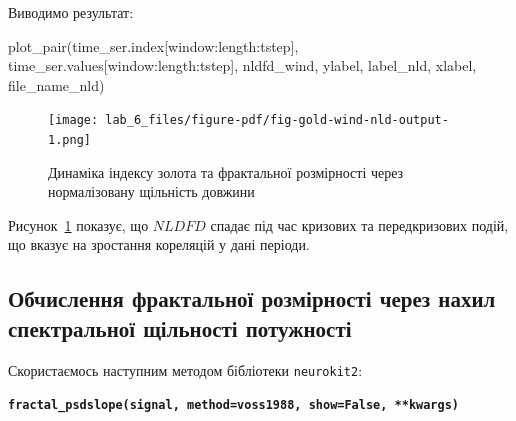 \documentclass[
  letterpaper,
]{report}
\newenvironment{Shaded}{\begin{snugshade}}{\end{snugshade}}
\newcommand{\NormalTok}[1]{\textcolor[rgb]{0.00,0.23,0.31}{#1}}
\begin{document}
Виводимо результат:

\begin{Shaded}
\begin{Highlighting}[]
\NormalTok{plot\_pair(time\_ser.index[window:length:tstep],}
\NormalTok{          time\_ser.values[window:length:tstep],}
\NormalTok{          nldfd\_wind, }
\NormalTok{          ylabel, }
\NormalTok{          label\_nld,}
\NormalTok{          xlabel,}
\NormalTok{          file\_name\_nld)}
\end{Highlighting}
\end{Shaded}

\begin{figure}[H]

{\centering \texttt{[image: lab\_6\_files/figure-pdf/fig-gold-wind-nld-output-1.png]}

}

\caption{\label{fig-gold-wind-nld}Динаміка індексу золота та фрактальної
розмірності через нормалізовану щільність довжини}

\end{figure}

Рисунок~\ref{fig-gold-wind-nld} показує, що \(NLDFD\) спадає під час
кризових та передкризових подій, що вказує на зростання кореляцій у дані
періоди.

\hypertarget{ux43eux431ux447ux438ux441ux43bux435ux43dux43dux44f-ux444ux440ux430ux43aux442ux430ux43bux44cux43dux43eux457-ux440ux43eux437ux43cux456ux440ux43dux43eux441ux442ux456-ux447ux435ux440ux435ux437-ux43dux430ux445ux438ux43b-ux441ux43fux435ux43aux442ux440ux430ux43bux44cux43dux43eux457-ux449ux456ux43bux44cux43dux43eux441ux442ux456-ux43fux43eux442ux443ux436ux43dux43eux441ux442ux456}{%
\subsection{Обчислення фрактальної розмірності через нахил спектральної
щільності
потужності}\label{ux43eux431ux447ux438ux441ux43bux435ux43dux43dux44f-ux444ux440ux430ux43aux442ux430ux43bux44cux43dux43eux457-ux440ux43eux437ux43cux456ux440ux43dux43eux441ux442ux456-ux447ux435ux440ux435ux437-ux43dux430ux445ux438ux43b-ux441ux43fux435ux43aux442ux440ux430ux43bux44cux43dux43eux457-ux449ux456ux43bux44cux43dux43eux441ux442ux456-ux43fux43eux442ux443ux436ux43dux43eux441ux442ux456}}

Скористаємось наступним методом бібліотеки \texttt{neurokit2}:

\textbf{\texttt{fractal\_psdslope(signal,\ method=\textquotesingle{}voss1988\textquotesingle{},\ show=False,\ **kwargs)}}
\end{document}
